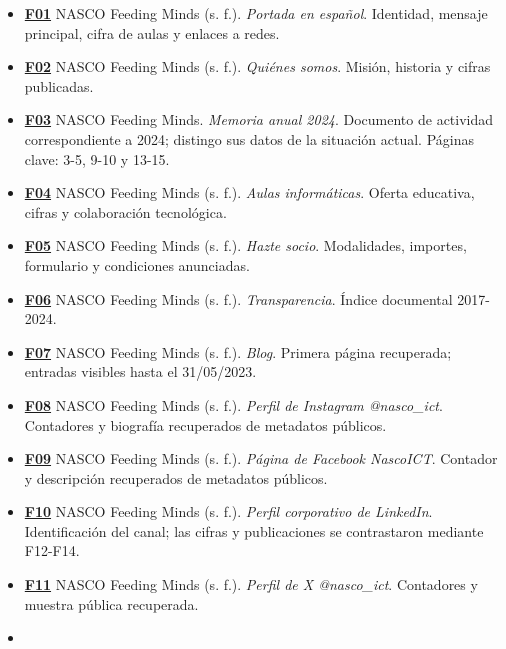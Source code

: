 \documentclass[
]{article}
\providecommand{\tightlist}{%
  \setlength{\itemsep}{0pt}\setlength{\parskip}{0pt}}
\begin{document}
\begin{itemize}
\tightlist
\item
  \textbf{\href{https://nascoict.org/}{F01}} NASCO Feeding Minds (s.
  f.). \emph{Portada en español}. Identidad, mensaje principal, cifra de
  aulas y enlaces a redes.
\item
  \textbf{\href{https://nascoict.org/quienes-somos/}{F02}} NASCO Feeding
  Minds (s. f.). \emph{Quiénes somos}. Misión, historia y cifras
  publicadas.
\item
  \textbf{\href{https://nascoict.org/wp-content/uploads/MEMORIA-2024.pdf}{F03}}
  NASCO Feeding Minds. \emph{Memoria anual 2024}. Documento de actividad
  correspondiente a 2024; distingo sus datos de la situación actual.
  Páginas clave: 3-5, 9-10 y 13-15.
\item
  \textbf{\href{https://nascoict.org/aulas-informaticas/}{F04}} NASCO
  Feeding Minds (s. f.). \emph{Aulas informáticas}. Oferta educativa,
  cifras y colaboración tecnológica.
\item
  \textbf{\href{https://nascoict.org/hazte-socio/}{F05}} NASCO Feeding
  Minds (s. f.). \emph{Hazte socio}. Modalidades, importes, formulario y
  condiciones anunciadas.
\item
  \textbf{\href{https://nascoict.org/transparencia/}{F06}} NASCO Feeding
  Minds (s. f.). \emph{Transparencia}. Índice documental 2017-2024.
\item
  \textbf{\href{https://nascoict.org/blog/}{F07}} NASCO Feeding Minds
  (s. f.). \emph{Blog}. Primera página recuperada; entradas visibles
  hasta el 31/05/2023.
\item
  \textbf{\href{https://www.instagram.com/nasco_ict/}{F08}} NASCO
  Feeding Minds (s. f.). \emph{Perfil de Instagram @nasco\_ict}.
  Contadores y biografía recuperados de metadatos públicos.
\item
  \textbf{\href{https://www.facebook.com/NascoICT/}{F09}} NASCO Feeding
  Minds (s. f.). \emph{Página de Facebook NascoICT}. Contador y
  descripción recuperados de metadatos públicos.
\item
  \textbf{\href{https://www.linkedin.com/company/nasco-feeding-minds/}{F10}}
  NASCO Feeding Minds (s. f.). \emph{Perfil corporativo de LinkedIn}.
  Identificación del canal; las cifras y publicaciones se contrastaron
  mediante F12-F14.
\item
  \textbf{\href{https://twitter.com/nasco_ict/}{F11}} NASCO Feeding
  Minds (s. f.). \emph{Perfil de X @nasco\_ict}. Contadores y muestra
  pública recuperada.
\item

\end{itemize}
\end{document}
